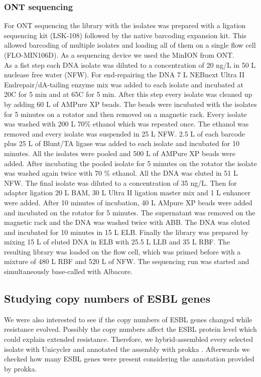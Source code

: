 \subsubsection{ONT sequencing}
For ONT sequencing the library with the isolates was prepared with a ligation sequencing kit (LSK-108) followed by the native barcoding expansion kit. This allowed barcoding of multiple isolates and loading all of them on a single flow cell (FLO-MIN106D). As a sequencing device we used the MinION from ONT. \\
As a fist step each DNA isolate was diluted to a concentration of 20 ng/\textmu L in 50 \textmu L nuclease free water (NFW). For end-repairing the DNA 7 \textmu L NEBnext Ultra II Endrepair/dA-tailing enzyme mix was added to each
isolate and incubated at 20\degree C for 5 min and at 65\degree C for 5 min. After this step every isolate was cleaned up by adding 60 \textmu L of AMPure XP beads. The beads were incubated with the isolates for 5 minutes on a rotator and then removed on a magnetic rack. Every isolate was washed with 200 \textmu L 70\% ethanol which was repeated once. The ethanol was removed and every isolate was suspended in 25 \textmu L NFW. 2.5 \textmu L of each barcode plus 25 \textmu L of Blunt/TA ligase was added to each isolate and incubated for 10 minutes. All the isolates were pooled and 500 \textmu L of AMPure XP beads were added. After incubating the pooled isolate for 5 minutes on the rotator the isolate was washed again twice with 70 \% ethanol. All the DNA was eluted in 51 \textmu L NFW. The final isolate was diluted to a concentration of 35 ng/\textmu L. Then for adapter ligation 20 \textmu L BAM, 30 \textmu L Ultra II ligation master mix and 1 \textmu L enhancer were added. After 10 minutes of incubation, 40 \textmu L AMpure XP beads were added and incubated on the rotator for 5 minutes. The supernatant was removed on the magnetic rack and the DNA was washed twice with ABB. The DNA was eluted and incubated for 10 minutes in 15 \textmu L ELB. Finally the library was prepared by mixing 15 \textmu L of eluted DNA in ELB with 25.5 \textmu L LLB and 35 \textmu L RBF. The resulting library was loaded on the flow cell, which was primed before with a mixture of 480 \textmu L RBF  and 520 \textmu L of NFW. The sequencing run was started and simultaneously base-called with Albacore.
\label{section:nanopore_sequenicng}

\subsection{Studying copy numbers of ESBL genes}
We were also interested to see if the copy numbers of ESBL genes changed while resistance evolved. Possibly the copy numbers affect the ESBL protein level which could explain extended resistance. Therefore, we hybrid-assembled every selected isolate with Unicycler \cite{wick_unicycler:_2017} and annotated the assembly with prokka \cite{seemann_prokka:_2014}. Afterwards we checked how many ESBL genes were present considering the annotation provided by prokka.

